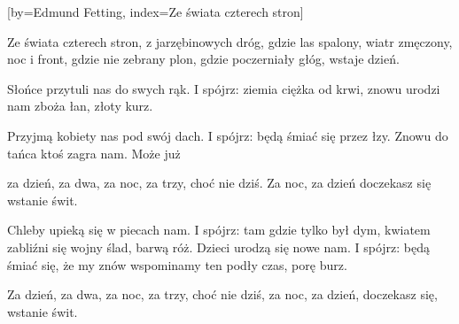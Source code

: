 [by={Edmund Fetting},
                     index={Ze świata czterech stron}]
\beginverse

Ze świata czterech stron,
z jarzębinowych dróg,
gdzie las spalony,
wiatr zmęczony,
noc i front,
gdzie nie zebrany plon,
gdzie poczerniały głóg,
wstaje dzień.

\endverse
\beginverse

Słońce przytuli nas do swych rąk.
I spójrz: ziemia ciężka od krwi,
znowu urodzi nam zboża łan,
złoty kurz.

\endverse
\beginverse

Przyjmą kobiety nas pod swój dach.
I spójrz: będą śmiać się przez łzy.
Znowu do tańca ktoś zagra nam.
Może już

\endverse
\beginverse

za dzień, za dwa,
za noc, za trzy,
choć nie dziś.
Za noc, za dzień
doczekasz się
wstanie świt.

\endverse
\beginverse

Chleby upieką się w piecach nam.
I spójrz: tam gdzie tylko był dym,
kwiatem zabliźni się wojny ślad,
barwą róż.
Dzieci urodzą się nowe nam.
I spójrz: będą śmiać się, że my
znów wspominamy ten podły czas,
porę burz.

\endverse
\beginverse

Za dzień, za dwa,
za noc, za trzy,
choć nie dziś,
za noc, za dzień,
doczekasz się,
wstanie świt.

\endverse
\endsong